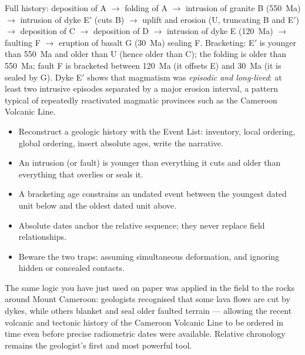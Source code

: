 \documentclass[11pt]{article}
\newcommand{\cle}[1]{{\popxbold\color{popdark}#1}}
\begin{document}
\begin{corrige}
Full history: deposition of A $\to$ folding of A $\to$ intrusion of granite B (\SI{550}{Ma}) $\to$ intrusion of dyke E$'$ (cuts B) $\to$ uplift and erosion (U, truncating B and E$'$) $\to$ deposition of C $\to$ deposition of D $\to$ intrusion of dyke E (\SI{120}{Ma}) $\to$ faulting F $\to$ eruption of basalt G (\SI{30}{Ma}) sealing F. Bracketing: E$'$ is younger than \SI{550}{Ma} and older than U (hence older than C); the folding is older than \SI{550}{Ma}; fault F is bracketed between \SI{120}{Ma} (it offsets E) and \SI{30}{Ma} (it is sealed by G). Dyke E$'$ shows that magmatism was \emph{episodic and long-lived}: at least two intrusive episodes separated by a major erosion interval, a pattern typical of repeatedly reactivated magmatic provinces such as the Cameroon Volcanic Line.
\end{corrige}

\begin{aretenir}
\begin{itemize}
\item Reconstruct a geologic history with the \cle{Event List}: inventory, local ordering, global ordering, insert absolute ages, write the narrative.
\item An intrusion (or fault) is younger than everything it cuts and older than everything that overlies or seals it.
\item A \cle{bracketing age} constrains an undated event between the youngest dated unit below and the oldest dated unit above.
\item Absolute dates anchor the relative sequence; they never replace field relationships.
\item Beware the two traps: assuming simultaneous deformation, and ignoring hidden or concealed contacts.
\end{itemize}
\end{aretenir}

\begin{savaistu}
The same logic you have just used on paper was applied in the field to the rocks around Mount Cameroon: geologists recognised that some lava flows are cut by dykes, while others blanket and seal older faulted terrain --- allowing the recent volcanic and tectonic history of the Cameroon Volcanic Line to be ordered in time even before precise radiometric dates were available. Relative chronology remains the geologist's first and most powerful tool.
\end{savaistu}
\end{document}
